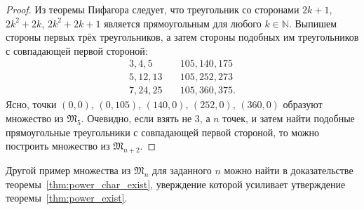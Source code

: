 \begin{proof}
	Из теоремы Пифагора следует, что треугольник со сторонами
	$2k+1$, $2k^2+2k$, $2k^2+2k+1$
	является прямоугольным для любого $k\in\mathbb{N}$.
	Выпишем стороны первых трёх треугольников,
	а затем стороны подобных им треугольников с совпадающей первой стороной:
	\begin{equation}
		\label{eq:PifagTriangles}
		\begin{array}{ll}
			3,  4,  5 & \quad 105, 140, 175 \\
			5, 12, 13 & \quad 105, 252, 273 \\
			7, 24, 25 & \quad 105, 360, 375.
		\end{array}
	\end{equation}
	Ясно, точки $(0,0)$, $(0,105)$, $(140,0)$, $(252,0)$, $(360,0)$
	образуют множество из $\mathfrak{M}_5$.
	Очевидно, если взять не 3, а $n$ точек, и затем найти подобные
	прямоугольные треугольники с совпадающей первой стороной,
	то можно построить множество из $\mathfrak{M}_{n+2}$.
\end{proof}

Другой пример множества из $\mathfrak{M}_{n}$ для заданного $n$
можно найти в доказательстве теоремы~\ref{thm:power_char_exist},
уверждение которой усиливает утверждение теоремы~\ref{thm:power_exist}.

